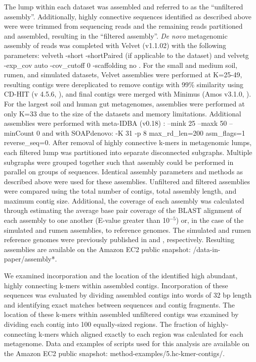 \documentclass[10pt]{article}
\begin{document}
The lump within each dataset was assembled and referred to as the ``unfiltered assembly''.  Additionally, highly connective sequences identified as described above were were trimmed from sequencing reads and the remaining reads partitioned and assembled, resulting in the ``filtered assembly''.  \emph{De novo} metagenomic assembly of reads was completed with Velvet (v1.1.02) with the following parameters: velveth -short -shortPaired (if applicable to the dataset) and velvetg -exp\_cov auto -cov\_cutoff 0 -scaffolding no \cite{Zerbino:2008p665}.  For the small and medium soil, rumen, and simulated datasets, Velvet assemblies were performed at K=25-49, resulting contigs were dereplicated to remove contigs with 99\% similarity using CD-HIT (v 4.5.6, \cite{Li:2001p1337}), and final contigs were merged with Minimus (Amos v3.1.0, \cite{Sommer:2007p1253}).  For the largest soil and human gut metagenomes, assemblies were performed at only K=33 due to the size of the datasets and memory limitations.  Additional assemblies were performed with meta-IDBA (v0.18) \cite{Peng:2011p898} : --mink 25 --maxk 50 --minCount 0 and with SOAPdenovo:  -K 31 -p 8  max\_rd\_len=200 asm\_flags=1 reverse\_seq=0.  After removal of highly connective k-mers in metagenomic lumps, each filtered lump was partitioned into separate disconnected subgraphs.  Multiple subgraphs were grouped together such that assembly could be performed in parallel on groups of sequences.  Identical assembly parameters and methods as described above were used for these assemblies.  Unfiltered and filtered assemblies were compared using the total number of contigs, total assembly length, and maximum contig size.  Additional, the coverage of each assembly was calculated through estimating the average base pair coverage of the BLAST alignment of each assembly to one another (E-value greater than 10$^{-5}$) or, in the case of the simulated and rumen assemblies, to reference genomes.  The simulated and rumen reference genomes were previously published in \cite{Hess:2011p686} and \cite{Pignatelli:2011p742}, respectively.  Resulting assemblies are available on the Amazon EC2 public snapshot: /data-in-paper/assembly*.

We examined incorporation and the location of the identified high abundant, highly connecting k-mers within assembled contigs.  Incorporation of these sequences was evaluated by dividing assembled contigs into words of 32 bp length and identifying exact matches between sequences and contig fragments.  The location of these k-mers within assembled unfiltered contigs was examined by dividing each contig into 100 equally-sized regions.  The fraction of highly-connecting k-mers which aligned exactly to each region was calculated for each metagenome. Data and examples of scripts used for this analysis are available on the Amazon EC2 public snapshot: method-examples/5.hc-kmer-contigs/.
\end{document}
